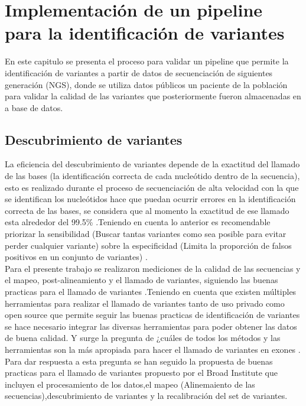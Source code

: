 \chapter{Implementación de un pipeline para la identificación de variantes}

En este capitulo se presenta el proceso para validar un pipeline que permite la  identificación de variantes a partir de datos de secuenciación de siguientes generación (NGS), donde se utiliza datos públicos un paciente de la población para validar la calidad  de las variantes que posteriormente fueron almacenadas en a base de datos.

\section{Descubrimiento de variantes}

La eficiencia del descubrimiento de variantes depende de la exactitud del llamado de las bases (la identificación correcta de cada nucleótido dentro de la secuencia), esto es realizado durante el proceso de secuenciación de alta velocidad con la que se identifican los nucleótidos hace que puedan ocurrir errores en la identificación correcta de las bases, se considera que al momento la exactitud de ese llamado esta alrededor del 99.5\% \cite{Tetreault2015}.Teniendo en cuenta lo anterior es recomendable  priorizar la sensibilidad (Buscar tantas variantes como sea posible para evitar perder cualquier variante) sobre la especificidad (Limita la proporción de falsos positivos en un conjunto de variantes) \cite{Auwera2014}.  \\

Para el presente trabajo se realizaron mediciones de la calidad de las secuencias y el mapeo, post-alineamiento y el llamado de variantes, siguiendo las buenas practicas para el llamado de variantes \cite{Fisch2015}.Teniendo en cuenta que existen múltiples herramientas para realizar el llamado de variantes tanto de uso privado como open source que permite  seguir las buenas practicas de identificación de variantes se hace necesario integrar las diversas herramientas para poder obtener las datos de buena calidad. Y surge la pregunta de ¿cuáles de todos los métodos y las herramientas son la más apropiada para hacer el llamado de variantes en exones \cite{Bao2014}\cite{Cornish2015}.\\

Para dar respuesta a esta pregunta se han seguido la propuesta de buenas practicas para el llamado de variantes propuesto por el Broad Institute que incluyen el procesamiento de los datos,el mapeo (Alinemaiento de las secuencias),descubrimiento de variantes y la recalibración del set de variantes.

